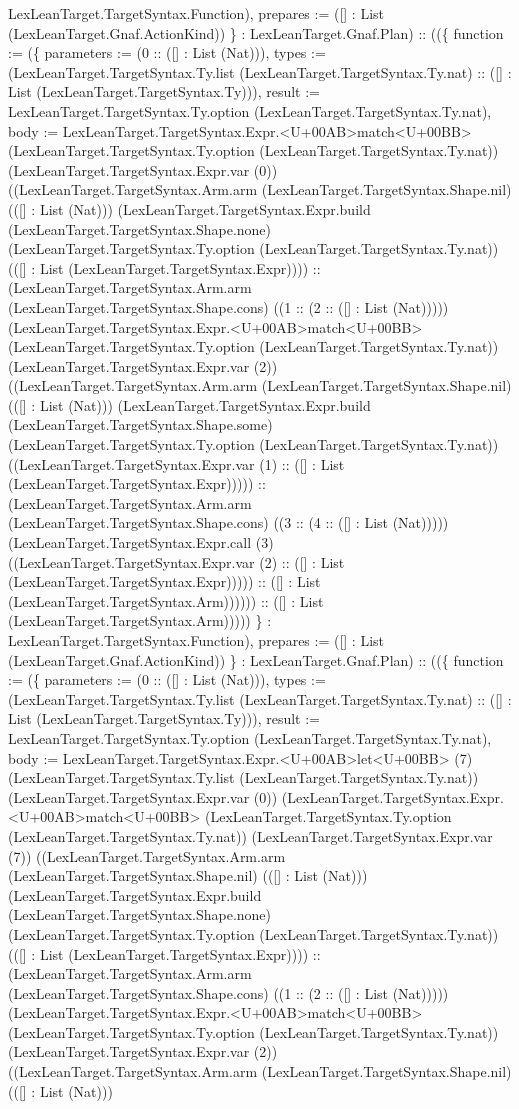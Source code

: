 \documentclass[11pt]{article}
\begin{document}
LexLeanTarget.TargetSyntax.Function), prepares := ([] : List (LexLeanTarget.Gnaf.ActionKind)) \} : LexLeanTarget.Gnaf.Plan) :: ((\{ function := (\{ parameters := (0 :: ([] : List (Nat))), types := (LexLeanTarget.TargetSyntax.Ty.list (LexLeanTarget.TargetSyntax.Ty.nat) :: ([] : List (LexLeanTarget.TargetSyntax.Ty))), result := LexLeanTarget.TargetSyntax.Ty.option (LexLeanTarget.TargetSyntax.Ty.nat), body := LexLeanTarget.TargetSyntax.Expr.<U+00AB>match<U+00BB> (LexLeanTarget.TargetSyntax.Ty.option (LexLeanTarget.TargetSyntax.Ty.nat)) (LexLeanTarget.TargetSyntax.Expr.var (0)) ((LexLeanTarget.TargetSyntax.Arm.arm (LexLeanTarget.TargetSyntax.Shape.nil) (([] : List (Nat))) (LexLeanTarget.TargetSyntax.Expr.build (LexLeanTarget.TargetSyntax.Shape.none) (LexLeanTarget.TargetSyntax.Ty.option (LexLeanTarget.TargetSyntax.Ty.nat)) (([] : List (LexLeanTarget.TargetSyntax.Expr)))) :: (LexLeanTarget.TargetSyntax.Arm.arm (LexLeanTarget.TargetSyntax.Shape.cons) ((1 :: (2 :: ([] : List (Nat))))) (LexLeanTarget.TargetSyntax.Expr.<U+00AB>match<U+00BB> (LexLeanTarget.TargetSyntax.Ty.option (LexLeanTarget.TargetSyntax.Ty.nat)) (LexLeanTarget.TargetSyntax.Expr.var (2)) ((LexLeanTarget.TargetSyntax.Arm.arm (LexLeanTarget.TargetSyntax.Shape.nil) (([] : List (Nat))) (LexLeanTarget.TargetSyntax.Expr.build (LexLeanTarget.TargetSyntax.Shape.some) (LexLeanTarget.TargetSyntax.Ty.option (LexLeanTarget.TargetSyntax.Ty.nat)) ((LexLeanTarget.TargetSyntax.Expr.var (1) :: ([] : List (LexLeanTarget.TargetSyntax.Expr))))) :: (LexLeanTarget.TargetSyntax.Arm.arm (LexLeanTarget.TargetSyntax.Shape.cons) ((3 :: (4 :: ([] : List (Nat))))) (LexLeanTarget.TargetSyntax.Expr.call (3) ((LexLeanTarget.TargetSyntax.Expr.var (2) :: ([] : List (LexLeanTarget.TargetSyntax.Expr))))) :: ([] : List (LexLeanTarget.TargetSyntax.Arm)))))) :: ([] : List (LexLeanTarget.TargetSyntax.Arm))))) \} : LexLeanTarget.TargetSyntax.Function), prepares := ([] : List (LexLeanTarget.Gnaf.ActionKind)) \} : LexLeanTarget.Gnaf.Plan) :: ((\{ function := (\{ parameters := (0 :: ([] : List (Nat))), types := (LexLeanTarget.TargetSyntax.Ty.list (LexLeanTarget.TargetSyntax.Ty.nat) :: ([] : List (LexLeanTarget.TargetSyntax.Ty))), result := LexLeanTarget.TargetSyntax.Ty.option (LexLeanTarget.TargetSyntax.Ty.nat), body := LexLeanTarget.TargetSyntax.Expr.<U+00AB>let<U+00BB> (7) (LexLeanTarget.TargetSyntax.Ty.list (LexLeanTarget.TargetSyntax.Ty.nat)) (LexLeanTarget.TargetSyntax.Expr.var (0)) (LexLeanTarget.TargetSyntax.Expr.<U+00AB>match<U+00BB> (LexLeanTarget.TargetSyntax.Ty.option (LexLeanTarget.TargetSyntax.Ty.nat)) (LexLeanTarget.TargetSyntax.Expr.var (7)) ((LexLeanTarget.TargetSyntax.Arm.arm (LexLeanTarget.TargetSyntax.Shape.nil) (([] : List (Nat))) (LexLeanTarget.TargetSyntax.Expr.build (LexLeanTarget.TargetSyntax.Shape.none) (LexLeanTarget.TargetSyntax.Ty.option (LexLeanTarget.TargetSyntax.Ty.nat)) (([] : List (LexLeanTarget.TargetSyntax.Expr)))) :: (LexLeanTarget.TargetSyntax.Arm.arm (LexLeanTarget.TargetSyntax.Shape.cons) ((1 :: (2 :: ([] : List (Nat))))) (LexLeanTarget.TargetSyntax.Expr.<U+00AB>match<U+00BB> (LexLeanTarget.TargetSyntax.Ty.option (LexLeanTarget.TargetSyntax.Ty.nat)) (LexLeanTarget.TargetSyntax.Expr.var (2)) ((LexLeanTarget.TargetSyntax.Arm.arm (LexLeanTarget.TargetSyntax.Shape.nil) (([] : List (Nat))) 
\end{document}
